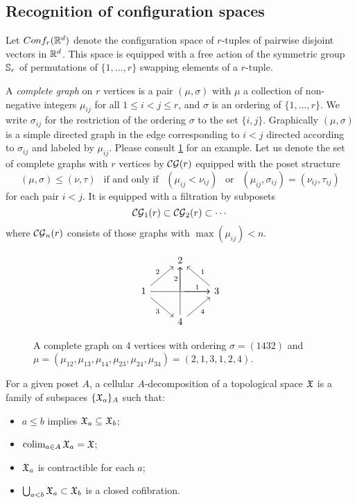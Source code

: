 \subsection{Recognition of configuration spaces}\label{ss:recognition}

Let $Conf_{r}(\mathbb{R}^{d})$ denote the configuration space of $r$-tuples of pairwise disjoint vectors in $\mathbb{R}^{d}$.
This space is equipped with a free action of the symmetric group $\mathbb{S}_r$ of permutations of $\{1,\dots,r\}$ swapping elements of a $r$-tuple.

\begin{definition}
	A \textit{complete graph} on $r$ vertices is a pair $(\mu,\sigma)$ with $\mu$ a collection of non-negative integers $\mu_{ij}$ for all $1 \leq i < j \leq r$, and $\sigma$ is an ordering of $\{1,\dots,r\}$.
	We write $\sigma_{ij}$ for the restriction of the ordering $\sigma$ to the set $\{i,j\}$.
	Graphically $(\mu,\sigma)$ is a simple directed graph in the edge corresponding to $i<j$ directed according to $\sigma_{ij}$ and labeled by $\mu_{ij}$.
	Please consult \cref{f:complete graph} for an example.
	Let us denote the set of complete graphs with $r$ vertices by $\mathcal{CG}(r)$ equipped with the poset structure
	\begin{equation*}
		(\mu,\sigma)\le (\nu,\tau) \ \ \text{ if and only if } \ \
		(\mu_{ij}<\nu_{ij}) \ \ \text{ or } \ \
		(\mu_{ij},\sigma_{ij})= (\nu_{ij},\tau_{ij})
	\end{equation*}
	for each pair $i<j$.
	It is equipped with a filtration by subposets
	\[
	\mathcal{CG}_1(r) \subset \mathcal{CG}_2(r) \subset \dotsb
	\]
	where $\mathcal{CG}_n(r)$ consists of those graphs with $\max(\mu_{ij})< n$.
\end{definition}

\begin{figure}
	\centering
	\begin{equation*}
		\begin{tikzcd}
			\ & 2 & \ \\
			1 \arrow[ur,"2"] \arrow[rr] \arrow[dr,"3"']& \arrow[r,"1"] \arrow[u,"2"] & 3 \arrow[ul,"1"'] \\
			\ & 4 \arrow[ur,"4"'] \arrow[uu] & \
		\end{tikzcd}
	\end{equation*}
	\caption{A complete graph on 4 vertices with ordering $\sigma=(1432)$ and $\mu=(\mu_{12},\mu_{13},\mu_{14},\mu_{23},\mu_{24},\mu_{34})=(2,1,3,1,2,4)$.}
	\label{f:complete graph}
\end{figure}

\begin{definition}
	For a given poset $A$, a cellular $A$-decomposition of a topological space $\mathfrak{X}$ is a family of subspaces $\{\mathfrak{X}_a\}_A$ such that:
	\begin{itemize}
		\item $a \leq b$ implies $\mathfrak{X}_a \subseteq \mathfrak{X}_b$;
		\item $\operatorname*{colim}_{a \in A} \mathfrak{X}_a = \mathfrak{X}$;
		\item $\mathfrak{X}_a$ is contractible for each $a$;
		\item $\bigcup_{a<b} \mathfrak{X}_a \subset \mathfrak{X}_b$ is a closed cofibration.
	\end{itemize}
\end{definition}

